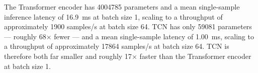 The Transformer encoder has \num{4004785} parameters and a mean single-sample
inference latency of \SI{16.9}{\milli\second} at batch size 1, scaling to a
throughput of approximately \num{1900} samples/\si{\second} at batch size 64.
TCN has only \num{59081} parameters — roughly \num{68}$\times$ fewer — and a
mean single-sample latency of \SI{1.00}{\milli\second}, scaling to a
throughput of approximately \num{17864} samples/\si{\second} at batch size 64.
TCN is therefore both far smaller and roughly \num{17}$\times$ faster than the
Transformer encoder at batch size 1.
